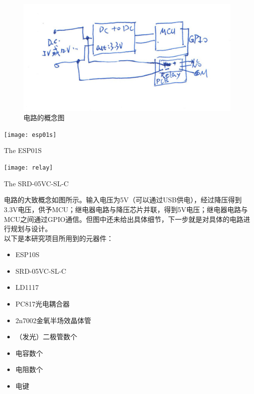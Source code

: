 \begin{figure}[h!]
	\includegraphics[width=\textwidth]{concept}
	\caption[concept]{电路的概念图}
\end{figure}

\begin{marginfigure}[-0.5cm]
	\texttt{[image: esp01s]}
	\caption[esp01s]{The ESP01S}
\end{marginfigure}

\begin{marginfigure}[0cm]
	\texttt{[image: relay]}
	\caption[relay]{The SRD-05VC-SL-C}
\end{marginfigure}


\par 电路的大致概念如图所示。输入电压为5V（可以通过USB供电），经过降压得到3.3V电压，供予MCU；继电器电路与降压芯片并联，得到5V电压；继电器电路与MCU之间通过GPIO通信。但图中还未给出具体细节，下一步就是对具体的电路进行规划与设计。\\
以下是本研究项目所用到的元器件：

\begin{itemize}
	\item ESP10S
	\item SRD-05VC-SL-C
	\item LD1117
	\item PC817光电耦合器
	\item 2n7002金氧半场效晶体管
	\item （发光）二极管数个
	\item 电容数个
	\item 电阻数个
	\item 电键
\end{itemize}

